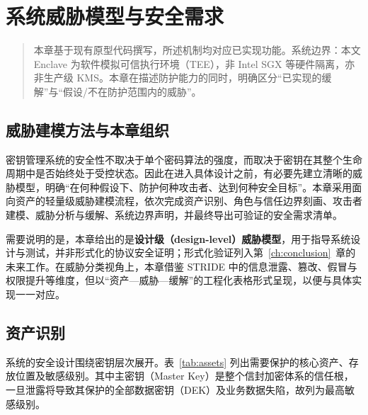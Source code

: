 \chapter{系统威胁模型与安全需求}
\label{ch:threat}

\begin{quote}\small
本章基于现有原型代码撰写，所述机制均对应已实现功能。系统边界：本文 Enclave 为软件模拟可信执行环境（TEE），非 Intel SGX 等硬件隔离，亦非生产级 KMS。本章在描述防护能力的同时，明确区分“已实现的缓解”与“假设/不在防护范围内的威胁”。
\end{quote}

\section{威胁建模方法与本章组织}

密钥管理系统的安全性不取决于单个密码算法的强度，而取决于密钥在其整个生命周期中是否始终处于受控状态。因此在进入具体设计之前，有必要先建立清晰的威胁模型，明确“在何种假设下、防护何种攻击者、达到何种安全目标”。本章采用面向资产的轻量级威胁建模流程，依次完成资产识别、角色与信任边界刻画、攻击者建模、威胁分析与缓解、系统边界声明，并最终导出可验证的安全需求清单。

需要说明的是，本章给出的是\textbf{设计级（design-level）威胁模型}，用于指导系统设计与测试，并非形式化的协议安全证明；形式化验证列入第~\ref{ch:conclusion}~章的未来工作。在威胁分类视角上，本章借鉴 STRIDE 中的信息泄露、篡改、假冒与权限提升等维度，但以“资产—威胁—缓解”的工程化表格形式呈现，以便与具体实现一一对应。

\section{资产识别}

系统的安全设计围绕密钥层次展开。表~\ref{tab:assets} 列出需要保护的核心资产、存放位置及敏感级别。其中主密钥（Master Key）是整个信封加密体系的信任根，一旦泄露将导致其保护的全部数据密钥（DEK）及业务数据失陷，故列为最高敏感级别。

